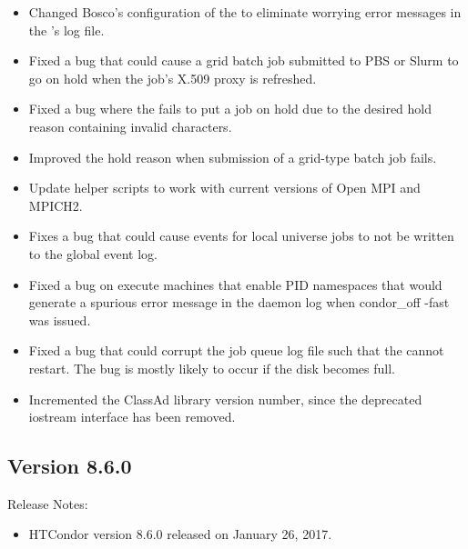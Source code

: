 \begin{itemize}
\item Changed Bosco's configuration of the  to eliminate
worrying error messages in the 's log file.

\item Fixed a bug that could cause a grid batch job submitted to PBS or
Slurm to go on hold when the job's X.509 proxy is refreshed.

\item Fixed a bug where the  fails to put a job on
hold due to the desired hold reason containing invalid characters.

\item Improved the hold reason when submission of a grid-type batch
job fails.

\item Update helper scripts to work with current versions of Open MPI and MPICH2.

\item Fixes a bug that could cause events for local universe jobs to not
be written to the global event log.

\item Fixed a bug on execute machines that enable PID namespaces that
would generate a spurious error message in the daemon log when condor\_off -fast was issued.

\item Fixed a bug that could corrupt the job queue log file such that
the  cannot restart.
The bug is mostly likely to occur if the disk becomes full.

\item Incremented the ClassAd library version number, since the deprecated
iostream interface has been removed.

\end{itemize}

\subsection*{\label{sec:New-8-6-0}Version 8.6.0}

\noindent Release Notes:

\begin{itemize}

\item HTCondor version 8.6.0 released on January 26, 2017.

\end{itemize}


